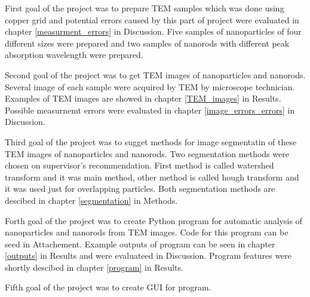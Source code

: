 \pagestyle{plain}

First goal of the project was to prepare TEM samples which was done using copper grid and potential errors caused by this part of project were evaluated in chapter \ref{measurment_errors} in Discussion. Five samples of nanoparticles of four different sizes were prepared and two samples of nanorods with different peak absorption wavelength were prepared.

Second goal of the project was to get TEM images of nanoparticles and nanorods. Several image of each sample were acquired by TEM by microscope technician. Examples of TEM images are showed in chapter \ref{TEM_images} in Results. Possible measurnemt errors were evaluated in chapter \ref{image_errors_errors} in Discussion.

Third goal of the project was to sugget methods for image segmentatin of these TEM images of nanoparticles and nanorods. Two segmentation methods were chosen on supervisor's recommendation. First method is called watershed transform and it was main method, other method is called hough transform and it was used just for overlapping particles. Both segmentation methods are descibed in chapter \ref{segmentation} in Methods.

Forth goal of the project was to create Python program for automatic analysis of nanoparticles and nanorods from TEM images. Code for this program can be seed in Attachement. Example outputs of program can be seen in chapter \ref{outputs} in Results and were evaluateed in Discussion. Program features were shortly descibed in chapter \ref{program} in Results.

Fifth goal of the project was to create GUI for program.